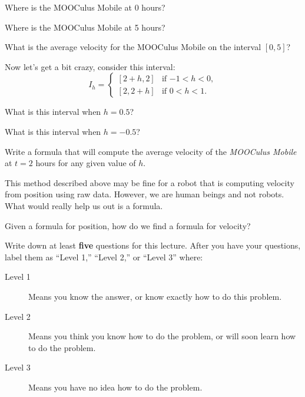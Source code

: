 \documentclass{ximera}
\begin{document}
\begin{question}
Where is the MOOCulus Mobile at 0 hours? 
\end{question}


\begin{question}
Where is the MOOCulus Mobile at 5 hours? 
\end{question}

\begin{question}
What is the average velocity for the MOOCulus Mobile on the interval
$[0,5]$?
\end{question}

Now let's get a bit crazy, consider this interval:
\[
I_h = 
\begin{cases}
[2+h,2]  & \text{if $-1<h<0$}, \\ %
[2,2+h]  & \text{if $0<h<1$}. 
\end{cases}
\]

\begin{question}
What is this interval when $h = 0.5$?
\end{question}

\begin{question}
What is this interval when $h = -0.5$?
\end{question}

\begin{question}
Write a formula that will compute the average velocity of the
\textit{MOOCulus Mobile} at $t=2$ hours for any given value of $h$.
\end{question}

This method described above may be fine for a robot that is computing
velocity from position using raw data. However, we are human beings
and not robots. What would really help us out is a formula. 



\begin{question}
Given a formula for position, how do we find a formula for velocity?
\end{question}

\begin{xarmaBoost}
Write down at least \textbf{five} questions for this lecture. After
you have your questions, label them as ``Level 1,'' ``Level 2,'' or ``Level 3'' where:
\begin{description}
\item[Level 1] Means you know the answer, or know exactly how to do
  this problem.
\item[Level 2] Means you think you know how to do the problem, or will
  soon learn how to do the problem.
\item[Level 3] Means you have no idea how to do the problem.
\end{description}
  \begin{freeResponse}
  \end{freeResponse}
\end{xarmaBoost}
\end{document}
